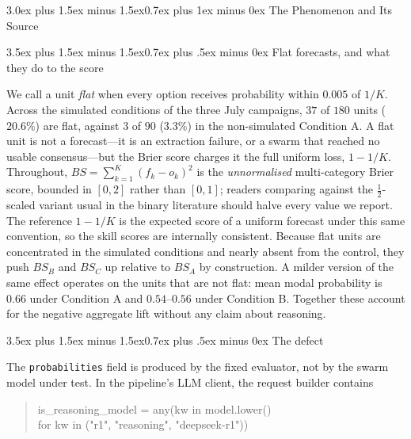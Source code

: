 \documentclass[10pt,conference]{IEEEtran}
\makeatletter
\renewcommand\section{\@startsection{section}{1}{\z@}%
  {3.0ex plus 1.5ex minus 1.5ex}{0.7ex plus 1ex minus 0ex}%
  {\normalfont\normalsize\centering\bfseries}}
\renewcommand\subsection{\@startsection{subsection}{2}{\z@}%
  {3.5ex plus 1.5ex minus 1.5ex}{0.7ex plus .5ex minus 0ex}%
  {\normalfont\normalsize\bfseries}}
\makeatother
\begin{document}
\section{The Phenomenon and Its Source}
\label{sec:audit}

\subsection{Flat forecasts, and what they do to the score}

We call a unit \emph{flat} when every option receives probability within $0.005$ of $1/K$. Across the simulated conditions of the three July campaigns, $37$ of $180$ units ($20.6\%$) are flat, against $3$ of $90$ ($3.3\%$) in the non-simulated Condition A. A flat unit is not a forecast---it is an extraction failure, or a swarm that reached no usable consensus---but the Brier score charges it the full uniform loss, $1 - 1/K$. Throughout, $BS = \sum_{k=1}^{K}(f_k - o_k)^2$ is the \emph{unnormalised} multi-category Brier score, bounded in $[0,2]$ rather than $[0,1]$; readers comparing against the $\frac{1}{2}$-scaled variant usual in the binary literature should halve every value we report. The reference $1 - 1/K$ is the expected score of a uniform forecast under this same convention, so the skill scores are internally consistent. Because flat units are concentrated in the simulated conditions and nearly absent from the control, they push $BS_B$ and $BS_C$ up relative to $BS_A$ by construction. A milder version of the same effect operates on the units that are not flat: mean modal probability is $0.66$ under Condition A and $0.54$--$0.56$ under Condition B. Together these account for the negative aggregate lift without any claim about reasoning.

\subsection{The defect}

The \texttt{probabilities} field is produced by the fixed evaluator, not by the swarm model under test. In the pipeline's LLM client, the request builder contains

\begin{quote}\ttfamily\footnotesize
is\_reasoning\_model = any(kw in model.lower()\\
\hspace*{2em}for kw in ("r1", "reasoning", "deepseek-r1"))
\end{quote}
\end{document}
